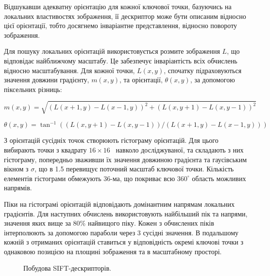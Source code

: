 Відшукавши адекватну орієнтацію для кожної ключової точки, базуючись на локальних властивостях зображення, її дескриптор може бути описаним відносно цієї орієнтації, тобто досягнемо інваріантне представлення, відносно повороту зображення.

Для пошуку локальних орієнтацій використовується розмите зображення $L$, що відповідає найближчому масштабу. Це забезпечує інваріантість всіх обчислень відносно масштабування. Для кожної точки, $L(x,y)$, спочатку підраховуються значення довжини градієнту, $m(x,y)$, та орієнтації, $\theta(x,y)$, за допомогою піксельних різниць:

\begin{equation}
  m(x,y) = \sqrt{(L(x+1, y) - L(x-1, y))^2 + (L(x,y+1) - L(x,y-1))^2} 
\end{equation}

\begin{equation}
  \theta(x,y) = \tan^{-1}((L(x,y+1) - L(x,y-1)) / (L(x+1,y) - L(x-1,y)))
\end{equation}

З орієнтацій сусідніх точок створюють гістограму орієнтацій. Для цього вибирають точки з квадрату $16\times16$~\cite{Meng_implementingthe} навколо досліджуваної, та складають з них гістограму, попередньо зваживши їх значення довжиною градієнта та гаусівським вікном з $\sigma$, що в 1.5 перевищує поточний масштаб ключової точки. Кількість елементів гістограми обмежують 36-ма, що покриває всю $360^\circ$ область можливих напрямів.

Піки на гістограмі орієнтацій відповідають домінантним напрямам локальних градієнтів. Для наступних обчислень використовують найбільший пік та напрями, значення яких вище за 80\% найвищого піку. Кожен з обчислених піків інтерполюють за допомогою параболи через 3 сусідні значення. В подальшому кожній з отриманих орієнтацій ставиться у відповідність окремі ключові точки з однаковою позицією на площині зображення та в масштабному просторі. 

\begin{figure}[h]
  \begin{minipage}[h]{0.49\linewidth}
  \end{minipage}
  \hfill
  \begin{minipage}[h]{0.49\linewidth}
  \end{minipage}
  \caption{Побудова SIFT-дескрипторів.}
  \label{fig:sift-descriptor}
\end{figure}

